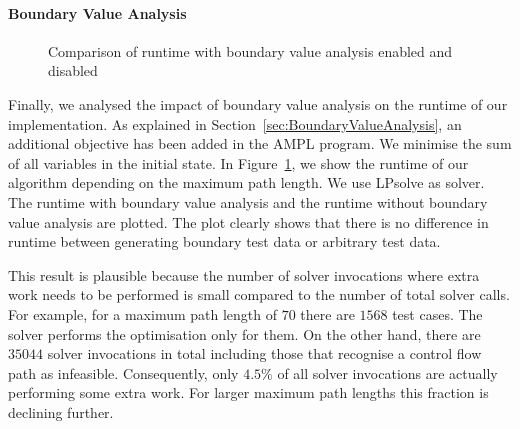 \documentclass[runningheads,a4paper]{llncs}%
\begin{document}
\paragraph{Boundary Value Analysis}
\label{sec:caseStudyBoundaryValues}
\begin{figure}
\begin{center}
%
\end{center}%
\caption{Comparison of runtime with boundary value analysis enabled and disabled}%
\label{fig:RuntimeBoundaryValue}%
\end{figure}%
Finally, we analysed the impact of boundary value analysis on the runtime of our
implementation. As explained in Section~\ref{sec:BoundaryValueAnalysis}, an
additional objective has been added in the AMPL program. We minimise the sum of
all variables in the initial state. In Figure~\ref{fig:RuntimeBoundaryValue}, we
show the runtime of our algorithm depending on the maximum path length. We use
LPsolve as solver. The runtime with boundary value analysis and the runtime
without boundary value analysis are plotted. The plot clearly shows that there
is no difference in runtime between generating boundary test data or
arbitrary test data.

This result is plausible because the number of solver invocations where extra
work needs to be performed is small compared to the number of total solver
calls. For example, for a maximum path length of $70$ there are $1568$ test
cases. The solver performs the optimisation only for them. On the other hand,
there are $35044$ solver invocations in total including those that recognise a
control flow path as infeasible. Consequently, only $4.5\%$ of all solver
invocations are actually performing some extra work. For larger maximum path
lengths this fraction is declining further.
%
\end{document}
